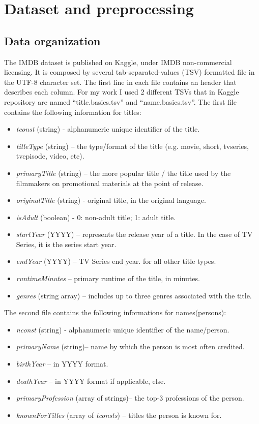 \documentclass{article}
\begin{document}
\section{Dataset and preprocessing}
\label{sec:preprocessing}
\subsection{Data organization}
The IMDB dataset is published on Kaggle, under IMDB non-commercial licensing. It is composed by several tab-separated-values (TSV) formatted file in the UTF-8 character set. The first line in each file contains an header that describes each column. For my work I used 2 different TSVs that in Kaggle repository are named ``title.basics.tsv'' and ``name.basics.tsv''. The first file contains the following information for titles:
\begin{itemize}
    \item \textit{tconst} (string) - alphanumeric unique identifier of the title.
    \item \textit{titleType} (string) – the type/format of the title (e.g. movie, short, tvseries, tvepisode, video, etc).
    \item \textit{primaryTitle} (string) – the more popular title / the title used by the filmmakers on promotional materials at the point of release.
    \item \textit{originalTitle} (string) - original title, in the original language.
    \item \textit{isAdult} (boolean) - 0: non-adult title; 1: adult title.
    \item \textit{startYear} (YYYY) – represents the release year of a title. In the case of TV Series, it is the series start year.
    \item \textit{endYear} (YYYY) – TV Series end year. for all other title types.
    \item \textit{runtimeMinutes} – primary runtime of the title, in minutes.
    \item \textit{genres} (string array) – includes up to three genres associated with the title.
\end{itemize}
The second file contains the following informations for names(persons):
\begin{itemize}
    \item \textit{nconst} (string) - alphanumeric unique identifier of the name/person.
    \item \textit{primaryName} (string)– name by which the person is most often credited.
    \item \textit{birthYear} – in YYYY format.
    \item \textit{deathYear} – in YYYY format if applicable, else.
    \item \textit{primaryProfession} (array of strings)– the top-3 professions of the
    person.
    \item \textit{knownForTitles} (array of \textit{tconsts}) – titles the person is known for.
\end{itemize}
\end{document}
